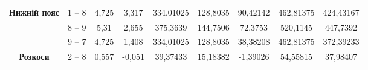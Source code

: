 \documentclass[a4paper,14pt]{article}
\begin{document}
\begin{landscape}
\begin{center}
\begin{longtable}{|c|c|c|c|c|c|c|c|c|}
    \multirow{3}{*}{\textbf{Нижній пояс}}    & 1 – 8                                & 4,725                                                                             & 3,317                                                                            & 334,01025                                                                                                        & 128,8035                                                                           & 90,42142                                                                           & 462,81375                     & 424,43167                     \\ \cline{2-9} 
                                             & 8 – 9                                & 5,31                                                                              & 2,655                                                                            & 375,3639                                                                                                         & 144,7506                                                                           & 72,3753                                                                            & 520,1145                      & 447,7392                      \\ \cline{2-9} 
                                             & 9 – 7                                & 4,725                                                                             & 1,408                                                                            & 334,01025                                                                                                        & 128,8035                                                                           & 38,38208                                                                           & 462,81375                     & 372,39233                     \\ \hline
    \multirow{4}{*}{\textbf{Розкоси}}        & 2 – 8                                & 0,557                                                                             & -0,051                                                                           & 39,37433                                                                                                         & 15,18382                                                                           & -1,39026                                                                           & 54,55815                      & 37,98407                      \\ \cline{2-9} 

\end{longtable}
\end{center}
\end{landscape}
\end{document}
